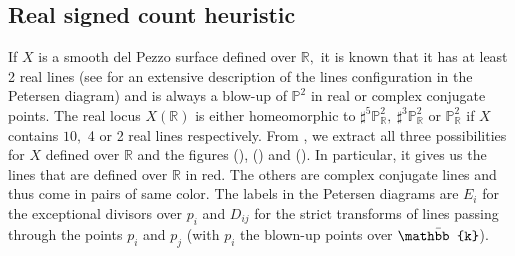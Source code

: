\documentclass{amsart}
\theoremstyle{plain}%
\theoremstyle{remark}
\theoremstyle{definition}
\newcommand{\ek}{\mathbb{k}}
\newcommand{\eP}{\mathbb{P}}
\newcommand{\eR}{\mathbb{R}}
\begin{document}
\subsection*{Real signed count heuristic}
If $X$ is a smooth del Pezzo surface defined over $\eR,$ it is known that it has at least 2 real lines (see \cite{Boitrel_dP5} for an extensive description of the lines configuration in the Petersen diagram) and is always a blow-up of $\eP^2$ in real or complex conjugate points. The real locus $X(\eR)$ is either homeomorphic to $\sharp^5 \eP^2_\eR,\ \sharp^3\eP^2_\eR$ or $\eP^2_\eR$ if $X$ contains $10,$ 4 or 2 real lines respectively. From \cite{Boitrel_dP5}, we extract all three possibilities for $X$ defined over $\eR$ and the figures (), () and (). In particular, it gives us the lines that are defined over $\eR$ in red. The others are complex conjugate lines and thus come in pairs of same color. The labels in the Petersen diagrams are $E_i$ for the exceptional divisors over $p_i$ and $D_{ij}$ for the strict transforms of lines passing through the points $p_i$ and $p_j$ (with $p_i$ the blown-up points over $\bar \ek$).
\end{document}
